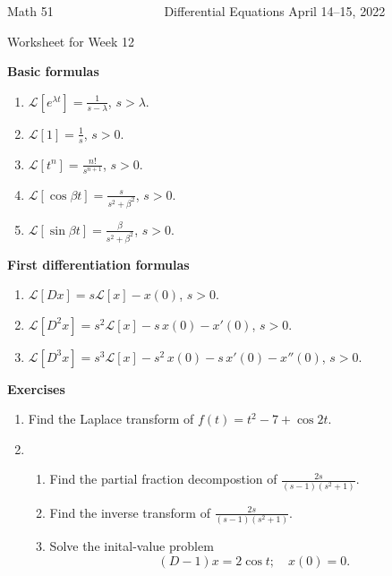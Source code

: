 \documentclass[12pt]{article}
\newcommand{\cL}{{\mathcal L}}
\begin{document}

\noindent
Math 51~~~~~~~~~~~~~~~~~ \hfill Differential Equations \hfill April 14--15, 2022 
\centerline{Worksheet for Week 12}

\bigskip
\noindent
\textbf{Basic formulas}

\begin{enumerate}
  \setlength{\itemsep}{2mm}

\item $\cL[e^{\lambda t}] = \displaystyle\frac{1}{s-\lambda}$, \quad $s > \lambda$.
\item $\cL[1] = \displaystyle\frac{1}{s}$, \quad $s > 0$.
\item $\cL[t^n] = \displaystyle\frac{n!}{s^{n+1}}$, \quad $s > 0$.
  \item $\cL[\cos \beta t] = \displaystyle\frac{s}{s^2+\beta^2}$, \quad $s > 0$.
  \item $\cL[\sin \beta t] = \displaystyle\frac{\beta}{s^2+\beta^2}$, \quad $s > 0$.
  \end{enumerate}

  \bigskip

  \noindent
  \textbf{First differentiation formulas}
  \begin{enumerate}
   \setlength{\itemsep}{2mm}

 \item $\cL[Dx] = s\cL[x] - x(0)$, \quad $s >0$.
 \item $\cL[D^2x] = s^2\cL[x] - s\,x(0) - x'(0)$, \quad $s >0$.
\item $\cL[D^3x] = s^3\cL[x] - s^2\,x(0) -s\, x'(0) - x''(0)$, \quad $s >0$.
\end{enumerate}

\bigskip
\begin{center}
  \textbf{Exercises}
  \end{center}


\begin{enumerate}
  \setlength{\itemsep}{2mm}
\item Find the Laplace transform of $f(t) = t^2 - 7 + \cos 2t$.

  \item \begin{enumerate}
  \item Find the partial fraction decompostion of
    $\displaystyle\frac{2s}{(s-1)(s^2+1)}$.
  
  \item Find the inverse transform of $\displaystyle\frac{2s}{(s-1)(s^2+1)}$.
  \item Solve the inital-value problem
    \[
      (D -1 )x = 2 \cos t; \quad x(0)=0.
    \]
    \end{enumerate}
  \end{enumerate}  
    \newpage
\end{document}
